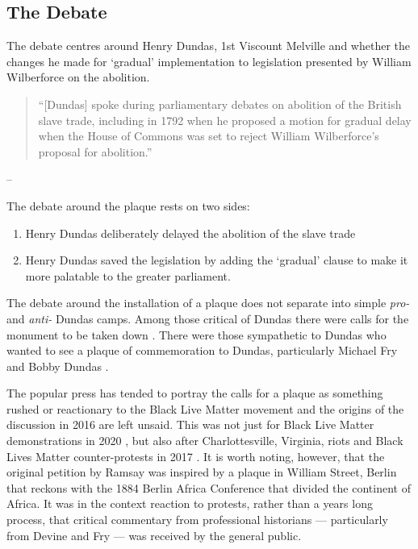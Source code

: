 \documentclass{scrartcl}
\renewcommand{\cite}{\parencite}
\begin{document}
\subsection{The Debate}

The debate centres around Henry Dundas, 1st Viscount Melville and whether the changes he made for `gradual' implementation to legislation presented by William Wilberforce on the abolition.

\begin{quotation}
    ``[Dundas] spoke during parliamentary debates on abolition of the British slave trade, including in 1792 when he proposed a motion for gradual delay when the House of Commons was set to reject William Wilberforce’s proposal for abolition.''
\end{quotation}
\begin{flushright}
-- \cite{mullen_2021}
\end{flushright}

The debate around the plaque rests on two sides:

\begin{enumerate}
    \item Henry Dundas deliberately delayed the abolition of the slave trade
    \item Henry Dundas saved the legislation by adding the `gradual' clause to make it more palatable to the greater parliament. 
\end{enumerate}

The debate around the installation of a plaque does not separate into simple \textit{pro-} and \textit{anti-} Dundas camps. 
Among those critical of Dundas there were calls for the monument to be taken down \cite{scotsman_2020,daily_2020,ramsay_2020}. There were those sympathetic to Dundas who wanted to see a plaque of commemoration to Dundas, particularly Michael Fry and Bobby Dundas \cite{c4n_2018}.

The popular press has tended to portray the calls for a plaque as something rushed or reactionary to the Black Live Matter movement and the origins of the discussion in 2016 are left unsaid. This was not just for Black Live Matter demonstrations in 2020 \cite{hoffman_2020, mitchell_2020, mckenna_2020}, but also after Charlottesville, Virginia, riots and Black Lives Matter counter-protests in 2017 \cite{daily_2017}.
It is worth noting, however, that the original petition by Ramsay was inspired by a plaque in William Street, Berlin \cite{ramsay_2016_2} that reckons with the 1884 Berlin Africa Conference that divided the continent of Africa.
It was in the context reaction to protests, rather than a years long process, that critical commentary from professional historians --- particularly from Devine \cite{devine_2020} and Fry \cite{fry_2020} --- was received by the general public.
\end{document}
